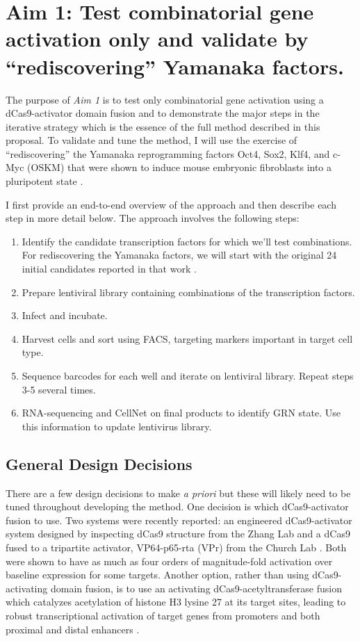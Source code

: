 \documentclass[10pt]{article}
\begin{document}
\section{Aim 1: Test combinatorial gene activation only and validate by ``rediscovering'' Yamanaka factors.}

The purpose of \textit{Aim 1} is to test only combinatorial gene activation using a dCas9-activator domain fusion and to demonstrate the major steps in the iterative strategy which is the essence of the full method described in this proposal. To validate and tune the method, I will use the exercise of ``rediscovering'' the Yamanaka reprogramming factors Oct4, Sox2, Klf4, and c-Myc (OSKM) that were shown to induce mouse embryonic fibroblasts into a pluripotent state \cite{takahashi2006induction}.

I first provide an end-to-end overview of the approach and then describe each step in more detail below. The approach involves the following steps:
\newline

\begin{enumerate}
    \setlength{\itemsep}{0pt}
    \item{Identify the candidate transcription factors for which we'll test combinations. For rediscovering the Yamanaka factors, we will start with the original 24 initial candidates reported in that work \cite{takahashi2006induction}.}
    \item{Prepare lentiviral library containing combinations of the transcription factors.}
    \item{Infect and incubate.}
    \item{Harvest cells and sort using FACS, targeting markers important in target cell type.}
    \item{Sequence barcodes for each well and iterate on lentiviral library. Repeat steps 3-5 several times.}
    \item{RNA-sequencing and CellNet on final products to identify GRN state. Use this information to update lentivirus library.}
\end{enumerate}

\subsection{General Design Decisions}

There are a few design decisions to make \textit{a priori} but these will likely need to be tuned throughout developing the method. One decision is which dCas9-activator fusion to use. Two systems were recently reported: an engineered dCas9-activator system designed by inspecting dCas9 structure from the Zhang Lab \cite{konermann2014genome} and a dCas9 fused to a tripartite activator, VP64-p65-rta (VPr) from the Church Lab \cite{chavez2015VPR}. Both were shown to have as much as four orders of magnitude-fold activation over baseline expression for some targets. Another option, rather than using dCas9-activating domain fusion, is to use an activating dCas9-acetyltransferase fusion which catalyzes acetylation of histone H3 lysine 27 at its target sites, leading to robust transcriptional activation of target genes from promoters and both proximal and distal enhancers \cite{hilton2015epigenome}.
\end{document}
